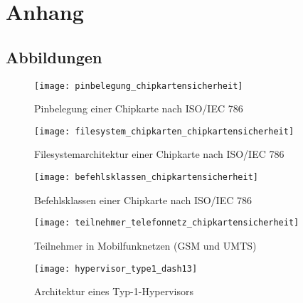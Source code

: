\section{Anhang}
\subsection{Abbildungen}
 \begin{figure}[htp]
  \begin{center}
   \texttt{[image: pinbelegung\_chipkartensicherheit]}
  \end{center}
  \caption[Pinbelegung einer Chipkarte]{Pinbelegung einer Chipkarte nach ISO/IEC 786 \cite{spitz11}}
  \label{abb:pinbelegung_chipkarten}
 \end{figure}

 \begin{figure}[htp]
  \begin{center}
   \texttt{[image: filesystem\_chipkarten\_chipkartensicherheit]}
  \end{center}
  \caption[Filesystemarchitektur einer Chipkarte]{Filesystemarchitektur einer Chipkarte nach ISO/IEC 786 \cite{spitz11}}
  \label{abb:filesystem_chipkarten}
 \end{figure}

  \begin{figure}[htp]
  \begin{center}
   \texttt{[image: befehlsklassen\_chipkartensicherheit]}
  \end{center}
  \caption[Befehlsklassen einer Chipkarte]{Befehlsklassen einer Chipkarte nach ISO/IEC 786 \cite{spitz11}}
  \label{abb:befehlsklassen_chipkarten}
 \end{figure}

  \begin{figure}[htp]
  \begin{center}
   \texttt{[image: teilnehmer\_telefonnetz\_chipkartensicherheit]}
  \end{center}
  \caption[Teilnehmer in Mobilfunknetzen]{Teilnehmer in Mobilfunknetzen (GSM und UMTS) \cite{spitz11}}
  \label{abb:teilnehmer_telefonnetz}
 \end{figure}

  \begin{figure}[htp]
  \begin{center}
   \texttt{[image: hypervisor\_type1\_dash13]}
  \end{center}
  \caption[Architektur eines Typ-1-Hypervisors]{Architektur eines Typ-1-Hypervisors \cite{dash13}}
  \label{abb:hypervisor_type1}
 \end{figure}

